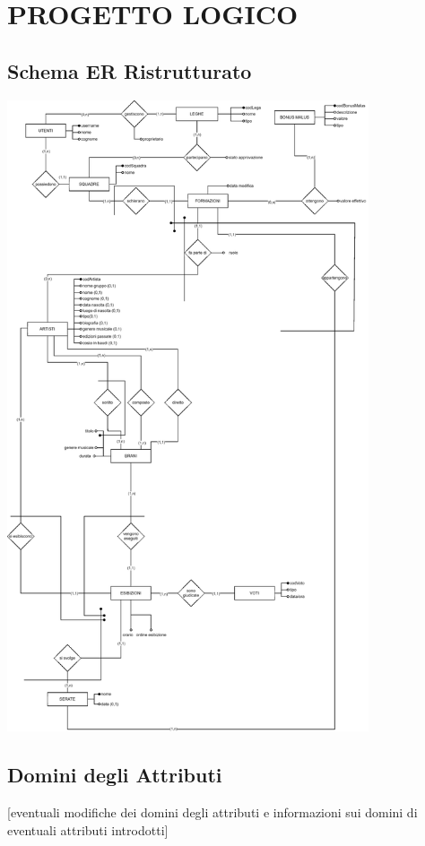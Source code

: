 \documentclass[a4paper,12pt]{article}
\begin{document}
\newpage
\section{PROGETTO LOGICO}
\subsection{Schema ER Ristrutturato}
\begin{center}
	\includegraphics[width=0.8\textwidth]{schema_ER_ristrutturato.eps}
\end{center}

\subsection{Domini degli Attributi}
[eventuali modifiche dei domini degli attributi e informazioni sui domini di eventuali attributi introdotti]
\end{document}
